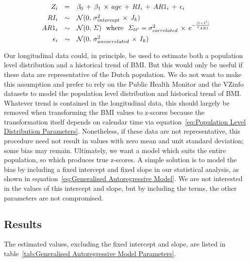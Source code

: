 \documentclass{imammb}
\numberwithin{equation}{section}
\begin{document}
\vspace{-1mm}

\begin{equation}
\label{eq:Generalised Autoregressive Model}
\begin{array}{@{\ }rcl@{\ }}
Z_{i} & = & \beta_0 \, + \, \beta_1 \, \times \, age \, + \, RI_i \, + \, AR1_{i} \, + \, \epsilon_{i}\\[1.5mm]
RI_i & \sim & \mathcal{N}(0, \, \sigma_{intercept}^2 \, \times \, J_k) \\[-0.9mm]
AR1_{i} & \sim & \mathcal{N}(0, \, \Sigma) \ \ \text{where} \ \ \Sigma_{tt'} = \sigma_{correlated}^2 \, \times \, e^{-\frac{|t - t'|}{\tau_{AR1}}}\\[1.5mm]
\epsilon_{i} & \sim & \mathcal{N}(0, \, \sigma_{uncorrelated}^2 \, \times \, I_k)
\end{array}
\end{equation}

\vspace{1mm}

Our longitudinal data could, in principle, be used to estimate both a population level distribution and a historical trend of BMI. But this would only be useful if these data are representative of the Dutch population. We do not want to make this assumption and prefer to rely on the Public Health Monitor and the VZinfo datasets to model the population level distribution and historical trend of BMI. Whatever trend is contained in the longitudinal data, this should largely be removed when transforming the BMI values to z-scores because the transformation itself depends on calendar time via equation~\ref{eq:Population Level Distribution Parameters}. Nonetheless, if these data are not representative, this procedure need not result in values with zero mean and unit standard deviation; some bias may remain. Ultimately, we want a model which suits the entire population, so which produces true z-scores. A simple solution is to model the bias by including a fixed intercept and fixed slope in our statistical analysis, as shown in equation~\ref{eq:Generalised Autoregressive Model}. We are not interested in the values of this intercept and slope, but by including the terms, the other parameters are not compromised.

\subsection{Results}
\label{sec:Individual Trajectories/Results}

The estimated values, excluding the fixed intercept and slope, are listed in table~\ref{tab:Generalised Autoregressive Model Parameters}.
\end{document}
